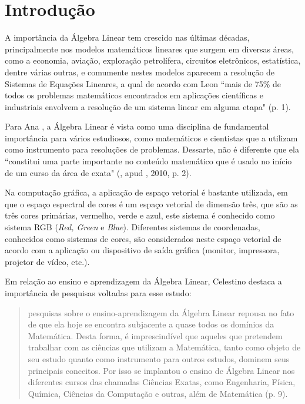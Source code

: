\chapter{Introdução}
\label{cap:introducao}

\noindent A importância da Álgebra Linear tem crescido nas últimas décadas, principalmente nos modelos matemáticos lineares que surgem em diversas áreas, como a economia, aviação, exploração petrolífera, circuitos eletrônicos, estatística, dentre várias outras, e comumente nestes modelos aparecem a resolução de Sistemas de Equações Lineares, a qual de acordo com Leon \cite{1998:Leon} ``mais de 75\% de todos os problemas matemáticos encontrados em aplicações científicas e industriais envolvem a resolução de um sistema linear em alguma etapa" (p. 1).  

Para Ana \cite{2010:furtado}, a Álgebra Linear é vista como uma disciplina de fundamental importância para vários estudiosos, como matemáticos e cientistas que a utilizam como instrumento para resoluções de problemas. Dessarte, não é diferente que ela ``constitui uma parte importante no conteúdo matemático que é usado no início de um curso da área de exata" (\cite{1998:dirier}, apud \cite{2010:furtado}, 2010, p. 2).

Na computação gráfica, a aplicação de espaço vetorial é bastante utilizada, em que o espaço espectral de cores é um espaço vetorial de dimensão três, que são as três cores primárias, vermelho, verde e azul, este sistema é conhecido como sistema RGB (\textit{Red, Green} e \textit{Blue}).  Diferentes sistemas de coordenadas, conhecidos como sistemas de cores, são considerados neste espaço vetorial de acordo com a aplicação ou dispositivo de saída gráfica (monitor, impressora, projetor de vídeo, etc.).

Em relação ao ensino e aprendizagem da Álgebra Linear, Celestino \cite{2000:celestino} destaca a importância de pesquisas voltadas para esse estudo:

\begin{quote}
    pesquisas sobre o ensino-aprendizagem da Álgebra Linear repousa no fato de que ela hoje se encontra subjacente a quase todos os domínios da Matemática. Desta forma, é imprescindível que aqueles que pretendem trabalhar com as ciências que utilizam a Matemática, tanto como objeto de seu estudo quanto como instrumento para outros estudos, dominem seus principais conceitos. Por isso se implantou o ensino de Álgebra Linear nos diferentes cursos das chamadas Ciências Exatas, como Engenharia, Física, Química, Ciências da Computação e outras, além de Matemática (p. 9).
\end{quote}

